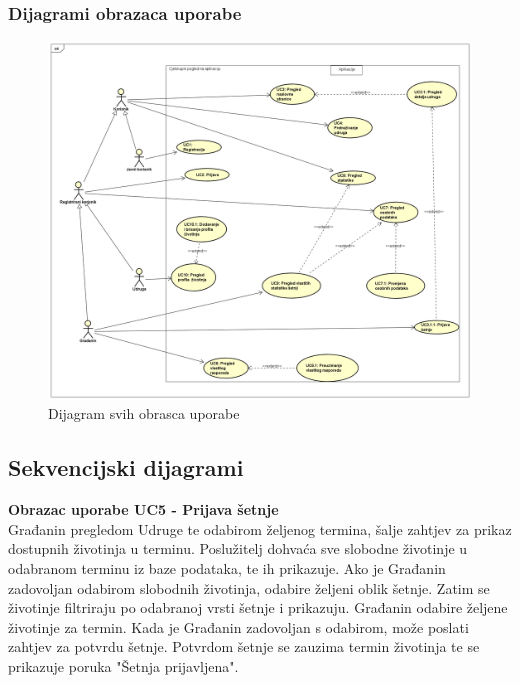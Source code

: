 				\eject
				\subsubsection{Dijagrami obrazaca uporabe}
					
					\begin{figure}[H]
						\includegraphics[width=\linewidth]{slike/UML.png}
						\centering
						\caption{Dijagram svih obrasca uporabe}
						\label{fig:uml}
					\end{figure}
					
				\eject		
				
			\subsection{Sekvencijski dijagrami}
				\noindent\textbf{Obrazac uporabe UC5 - Prijava šetnje}\\
				
				\noindent Građanin pregledom Udruge te odabirom željenog termina, šalje zahtjev za prikaz dostupnih životinja
				u terminu. Poslužitelj dohvaća sve slobodne životinje u odabranom terminu iz baze podataka, te ih 
				prikazuje. Ako je Građanin zadovoljan odabirom slobodnih životinja, odabire željeni oblik šetnje.
				Zatim se životinje filtriraju po odabranoj vrsti šetnje i prikazuju. Građanin odabire željene 
				životinje za termin. Kada je Građanin zadovoljan s odabirom, može poslati zahtjev za potvrdu 
				šetnje. Potvrdom šetnje se zauzima termin životinja te se prikazuje poruka "Šetnja prijavljena".
				
